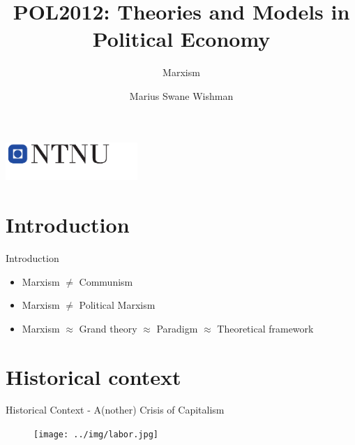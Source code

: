 \documentclass{beamer}
\title{POL2012: Theories and Models in Political Economy}
\subtitle{Marxism}
\date{}
\author{Marius Swane Wishman}
\institute{Department of Sociology and Political Science}
\begin{document}
\begin{frame}[plain]
\titlepage %
\centering %
\includegraphics[width=5cm]{logo_ntnu_u-slagord.pdf}
\end{frame}


\section{Introduction} %
\begin{frame}{Introduction}
\begin{itemize}[<+- | alert@+>]
    \item Marxism $\neq$ Communism
    \item Marxism $\neq$ Political Marxism
    \item Marxism $\approx$ Grand theory $\approx$ Paradigm  $\approx$ Theoretical framework 
\end{itemize} 
\end{frame}{}

\section{Historical context}

\begin{frame}{Historical Context - A(nother) Crisis of Capitalism}
    \begin{figure}
        \centering
        \texttt{[image: ../img/labor.jpg]}
        \label{fig:labor}
    \end{figure}{}
\end{frame}
\end{document}
